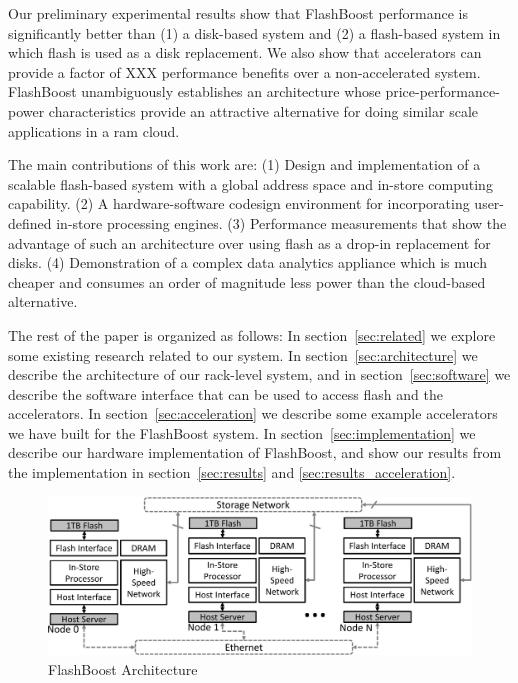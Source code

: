 Our preliminary experimental results show that FlashBoost performance is
significantly better than (1) a disk-based system and (2) a flash-based system
in which flash is used as a disk replacement. We also show that accelerators can
provide a factor of XXX performance benefits over a non-accelerated system.
FlashBoost unambiguously establishes an architecture whose
price-performance-power characteristics provide an attractive alternative for
doing similar scale applications in a ram cloud.

The main contributions of this work are: (1) Design and implementation of a
scalable flash-based system with a global address space and in-store computing
capability. (2) A hardware-software codesign environment for incorporating
user-defined in-store processing engines. (3) Performance measurements that show
the advantage of such an architecture over using flash as a drop-in replacement
for disks. (4) Demonstration of a complex data analytics appliance which is much
cheaper and consumes an order of magnitude less power than the cloud-based
alternative.

The rest of the paper is organized as follows: In section~\ref{sec:related} we
explore some existing research related to our system. In
section~\ref{sec:architecture} we describe the architecture of our rack-level
system, and in section~\ref{sec:software} we describe the software interface
that can be used to access flash and the accelerators. In
section~\ref{sec:acceleration} we describe some example accelerators we have
built for the FlashBoost system. In section~\ref{sec:implementation} we describe
our hardware implementation of FlashBoost, and show our results from the
implementation in section~\ref{sec:results} and \ref{sec:results_acceleration}.

\begin{figure}[ht]
	\begin{center}
	\includegraphics[width=0.8\paperwidth]{figures/architecture-crop.pdf}
	\caption{FlashBoost Architecture}
	\label{fig:architecture}
	\end{center}
\end{figure}

